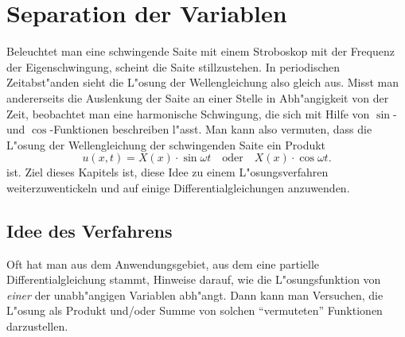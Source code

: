 %
%
%
\rhead{}
\chapter{Separation der Variablen\label{chapter-separation}}
Beleuchtet man eine schwingende Saite mit einem Stroboskop mit der
Frequenz der Eigenschwingung, scheint die Saite stillzustehen. 
In periodischen Zeit\-ab\-st"an\-den sieht die L"osung der Wellengleichung
also gleich aus.
Misst man andererseits die Auslenkung der Saite
an einer Stelle in Abh"angigkeit von der Zeit, beobachtet man
eine harmonische Schwingung, die sich mit Hilfe von $\sin$- und
$\cos$-Funktionen beschreiben l"asst. Man kann also vermuten,
dass die L"osung der Wellengleichung der schwingenden Saite
ein Produkt
\[
u(x,t)=X(x)\cdot\sin\omega t\quad\text{oder}\quad X(x)\cdot\cos\omega t.
\]
ist. Ziel dieses Kapitels ist, diese Idee zu einem L"osungsverfahren
weiterzuwentickeln und auf einige Differentialgleichungen anzuwenden.

\section{Idee des Verfahrens}
Oft hat man aus dem Anwendungsgebiet, aus dem eine partielle
Differentialgleichung stammt, Hinweise darauf, wie die L"osungsfunktion
von {\em einer} der unabh"angigen Variablen abh"angt.
Dann kann man Versuchen, die L"osung als Produkt und/oder Summe von
solchen ``vermuteten'' Funktionen darzustellen.

